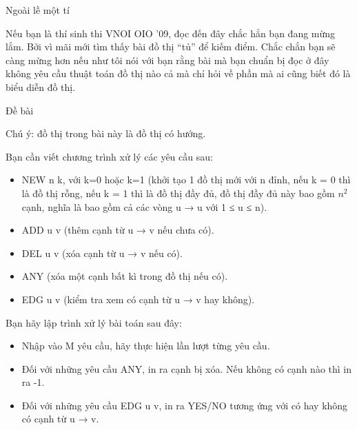 Ngoài lề một tí     

   Nếu bạn là thí sinh thi VNOI OIO '09, đọc đến đây chắc hẳn bạn đang mừng lắm. Bởi vì mãi mới tìm thấy bài đồ thị “tủ” để kiếm điểm. Chắc chắn bạn sẽ càng mừng hơn nếu như tôi nói với bạn rằng bài mà bạn chuẩn bị đọc ở đây không yêu cầu thuật toán đồ thị nào cả mà chỉ hỏi về phần mà ai cũng biết đó là biểu diễn đồ thị.  

       Đề bài     

   Chú ý: đồ thị trong bài này là đồ thị có hướng.  

   Bạn cần viết chương trình xử lý các yêu cầu sau:  
\begin{itemize}
	\item     NEW n k, với k=0 hoặc k=1 (khởi tạo 1 đồ thị mới với n đỉnh, nếu k = 0 thì là đồ thị rỗng, nếu k = 1 thì là đồ thị đầy đủ, đồ thị đầy đủ này bao gồm $n^{2}$    cạnh, nghĩa là bao gồm cả các vòng u → u với 1 ≤ u ≤ n).   
	\item     ADD u v (thêm cạnh từ u → v nếu chưa có).   
	\item     DEL u v (xóa cạnh từ u → v nếu có).   
	\item     ANY (xóa một cạnh bất kì trong đồ thị nếu có).   
	\item     EDG u v (kiểm tra xem có cạnh từ u → v hay không).   
\end{itemize}

   Bạn hãy lập trình xử lý bài toán sau đây:  
\begin{itemize}
	\item     Nhập vào M yêu cầu, hãy thực hiện lần lượt từng yêu cầu.   
	\item     Đối với những yêu cầu ANY, in ra cạnh bị xóa. Nếu không có cạnh nào thì in ra -1.   
	\item     Đối với những yêu cầu EDG u v, in ra YES/NO tương ứng với có hay không có cạnh từ u → v.   
\end{itemize}